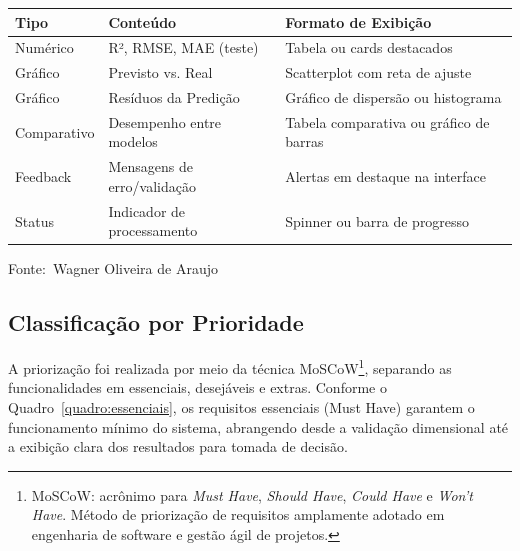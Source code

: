 \documentclass[12pt,a4paper]{article}
\newcommand{\oautor}{Wagner Oliveira de Araujo}
\begin{document}
\begin{quadro}[ht]
\centering
\small
\caption{Saídas esperadas do sistema}
\label{quadro:saidas}
\begin{threeparttable}
\begin{tabularx}{\textwidth}{|l|l|X|} \hline
\textbf{Tipo} & \textbf{Conteúdo} & \textbf{Formato de Exibição} \\ \hline
Numérico & R², RMSE, MAE (teste) & Tabela ou cards destacados \\ \hline
Gráfico & Previsto vs. Real & Scatterplot com reta de ajuste \\ \hline
Gráfico & Resíduos da Predição & Gráfico de dispersão ou histograma \\ \hline
Comparativo & Desempenho entre modelos & Tabela comparativa ou gráfico de barras \\ \hline
Feedback & Mensagens de erro/validação & Alertas em destaque na interface \\ \hline
Status & Indicador de processamento & Spinner ou barra de progresso \\ \hline
\end{tabularx}
\begin{tablenotes}[flushleft]
\footnotesize
\item Fonte:~\oautor
\end{tablenotes}
\end{threeparttable}
\end{quadro}

\newpage
\subsection{Classificação por Prioridade}

A priorização foi realizada por meio da técnica MoSCoW\footnote{MoSCoW: acrônimo para \textit{Must Have}, \textit{Should Have},
\textit{Could Have} e \textit{Won't Have}. Método de priorização de requisitos
amplamente adotado em engenharia de software e gestão ágil de projetos.}, separando as funcionalidades em essenciais, desejáveis e extras. Conforme o Quadro~\ref{quadro:essenciais}, os requisitos essenciais (Must Have) garantem o funcionamento mínimo do sistema, abrangendo desde a validação dimensional até a exibição clara dos resultados para tomada de decisão.
\end{document}
